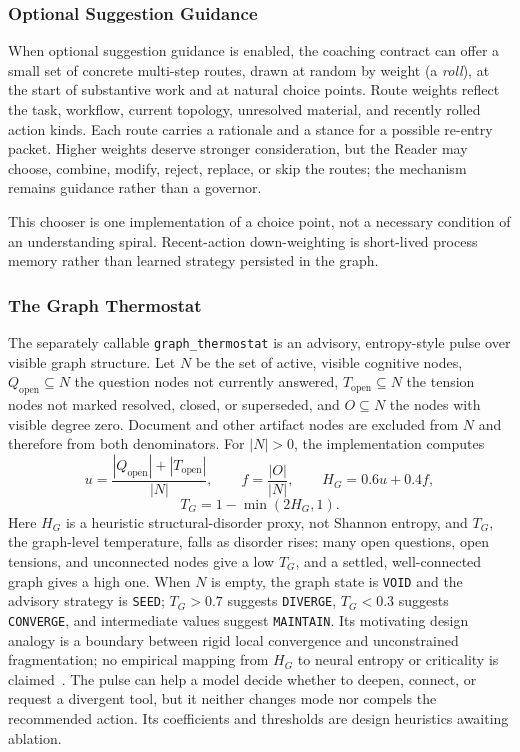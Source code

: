 \subsubsection{Optional Suggestion Guidance}

When optional suggestion guidance is enabled, the coaching contract can offer a small set of concrete multi-step routes, drawn at random by weight (a \emph{roll}), at the start of substantive work and at natural choice points. Route weights reflect the task, workflow, current topology, unresolved material, and recently rolled action kinds. Each route carries a rationale and a stance for a possible re-entry packet. Higher weights deserve stronger consideration, but the Reader may choose, combine, modify, reject, replace, or skip the routes; the mechanism remains guidance rather than a governor.

This chooser is one implementation of a choice point, not a necessary condition of an understanding spiral. Recent-action down-weighting is short-lived process memory rather than learned strategy persisted in the graph.

\subsubsection{The Graph Thermostat}
\label{sec:thermostat}

The separately callable \texttt{graph\_thermostat} is an advisory, entropy-style pulse over visible graph structure. Let $N$ be the set of active, visible cognitive nodes, $Q_{\mathrm{open}}\subseteq N$ the question nodes not currently answered, $T_{\mathrm{open}}\subseteq N$ the tension nodes not marked resolved, closed, or superseded, and $O\subseteq N$ the nodes with visible degree zero. Document and other artifact nodes are excluded from $N$ and therefore from both denominators. For $|N|>0$, the implementation computes
\[
u=\frac{|Q_{\mathrm{open}}|+|T_{\mathrm{open}}|}{|N|},
\qquad
f=\frac{|O|}{|N|},
\qquad
H_G=0.6u+0.4f,
\]
\[
T_G=1-\min(2H_G,1).
\]
Here $H_G$ is a heuristic structural-disorder proxy, not Shannon entropy, and $T_G$, the graph-level temperature, falls as disorder rises: many open questions, open tensions, and unconnected nodes give a low $T_G$, and a settled, well-connected graph gives a high one. When $N$ is empty, the graph state is \texttt{VOID} and the advisory strategy is \texttt{SEED}; $T_G>0.7$ suggests \texttt{DIVERGE}, $T_G<0.3$ suggests \texttt{CONVERGE}, and intermediate values suggest \texttt{MAINTAIN}. Its motivating design analogy is a boundary between rigid local convergence and unconstrained fragmentation; no empirical mapping from $H_G$ to neural entropy or criticality is claimed~\cite{carhartharris2014entropic}. The pulse can help a model decide whether to deepen, connect, or request a divergent tool, but it neither changes mode nor compels the recommended action. Its coefficients and thresholds are design heuristics awaiting ablation.

